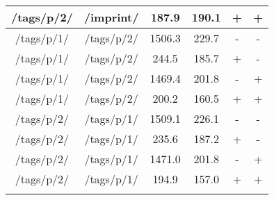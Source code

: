 \begin{appendix}
\begin{center}
\begin{longtable}{cccccc}
/tags/p/2/ & /imprint/ & 187.9 & 190.1 & + & + \\
\hline
\hline
/tags/p/1/ & /tags/p/2/ & 1506.3 & 229.7 & - & - \\
/tags/p/1/ & /tags/p/2/ & 244.5 & 185.7 & + & - \\
/tags/p/1/ & /tags/p/2/ & 1469.4 & 201.8 & - & + \\
/tags/p/1/ & /tags/p/2/ & 200.2 & 160.5 & + & + \\
\hline
/tags/p/2/ & /tags/p/1/ & 1509.1 & 226.1 & - & - \\
/tags/p/2/ & /tags/p/1/ & 235.6 & 187.2 & + & - \\
/tags/p/2/ & /tags/p/1/ & 1471.0 & 201.8 & - & + \\
/tags/p/2/ & /tags/p/1/ & 194.9 & 157.0 & + & + \\
\hline
\label{tab:curl_results_external}
\end{longtable}
\end{center}

\newpage{}


\end{appendix}
